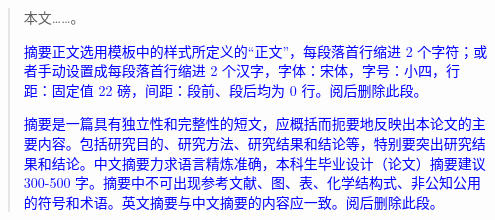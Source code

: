 
\begin{abstract}
本文……。

\textcolor{blue}{摘要正文选用模板中的样式所定义的“正文”，每段落首行缩进 2 个字符；或者手动设置成每段落首行缩进 2 个汉字，字体：宋体，字号：小四，行距：固定值 22 磅，间距：段前、段后均为 0 行。阅后删除此段。}

\textcolor{blue}{摘要是一篇具有独立性和完整性的短文，应概括而扼要地反映出本论文的主要内容。包括研究目的、研究方法、研究结果和结论等，特别要突出研究结果和结论。中文摘要力求语言精炼准确，本科生毕业设计（论文）摘要建议 300-500 字。摘要中不可出现参考文献、图、表、化学结构式、非公知公用的符号和术语。英文摘要与中文摘要的内容应一致。阅后删除此段。}

\end{abstract}

